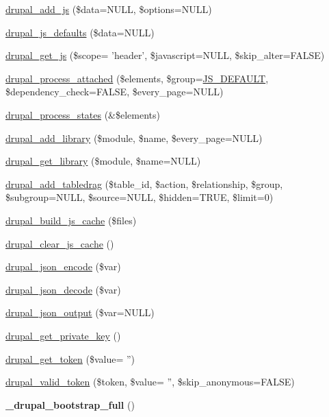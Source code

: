 \begin{DoxyCompactItemize}
\hyperlink{common_8inc_a623370a2c3c2de0390dab078d17dca02}{drupal\_\-add\_\-js} (\$data=NULL, \$options=NULL)
\item 
\hyperlink{common_8inc_a55203a07884e02b18a3be2a630c3fab3}{drupal\_\-js\_\-defaults} (\$data=NULL)
\item 
\hyperlink{common_8inc_ac4d279ffd40eae67ace8459cd3e6e3b5}{drupal\_\-get\_\-js} (\$scope= 'header', \$javascript=NULL, \$skip\_\-alter=FALSE)
\item 
\hyperlink{common_8inc_a31e3a25219e1d3a2f74670694b30dee6}{drupal\_\-process\_\-attached} (\$elements, \$group=\hyperlink{common_8inc_ade8dfc1503d597ba5ea4af975b0d8811}{JS\_\-DEFAULT}, \$dependency\_\-check=FALSE, \$every\_\-page=NULL)
\item 
\hyperlink{common_8inc_a335ef221d12db75393875deed0622ea1}{drupal\_\-process\_\-states} (\&\$elements)
\item 
\hyperlink{common_8inc_a10d0b7349429391743b9ffc49b48908a}{drupal\_\-add\_\-library} (\$module, \$name, \$every\_\-page=NULL)
\item 
\hyperlink{common_8inc_aa535ac5edd443308d3b2812caf1a1b85}{drupal\_\-get\_\-library} (\$module, \$name=NULL)
\item 
\hyperlink{common_8inc_ab905af5d90a84b5d48f3a517992875f5}{drupal\_\-add\_\-tabledrag} (\$table\_\-id, \$action, \$relationship, \$group, \$subgroup=NULL, \$source=NULL, \$hidden=TRUE, \$limit=0)
\item 
\hyperlink{common_8inc_a1e1e39db4d513a984d7d76ba8cd68a9b}{drupal\_\-build\_\-js\_\-cache} (\$files)
\item 
\hyperlink{common_8inc_ac05e083cb7cb02084601f8d2103b0405}{drupal\_\-clear\_\-js\_\-cache} ()
\item 
\hyperlink{group__php__wrappers_gaf09c80fb758b9f3657772e26817e37b9}{drupal\_\-json\_\-encode} (\$var)
\item 
\hyperlink{group__php__wrappers_gae065f2a8115ef999b74d765c8e7f35ff}{drupal\_\-json\_\-decode} (\$var)
\item 
\hyperlink{common_8inc_a27dfc2976ed1a73d926838793dc06e1e}{drupal\_\-json\_\-output} (\$var=NULL)
\item 
\hyperlink{common_8inc_a73373e2d357d0e624c209efe27515af6}{drupal\_\-get\_\-private\_\-key} ()
\item 
\hyperlink{common_8inc_a16989177d9fa05df9b45e8797ce04994}{drupal\_\-get\_\-token} (\$value= '')
\item 
\hyperlink{common_8inc_a343a6ad44cfc1007b618b245f9366be8}{drupal\_\-valid\_\-token} (\$token, \$value= '', \$skip\_\-anonymous=FALSE)
\item 
\hypertarget{common_8inc_ab7818b78cd7ba93b8b7522324bddb72d}{
{\bfseries \_\-drupal\_\-bootstrap\_\-full} ()}
\label{common_8inc_ab7818b78cd7ba93b8b7522324bddb72d}


\end{DoxyCompactItemize}
